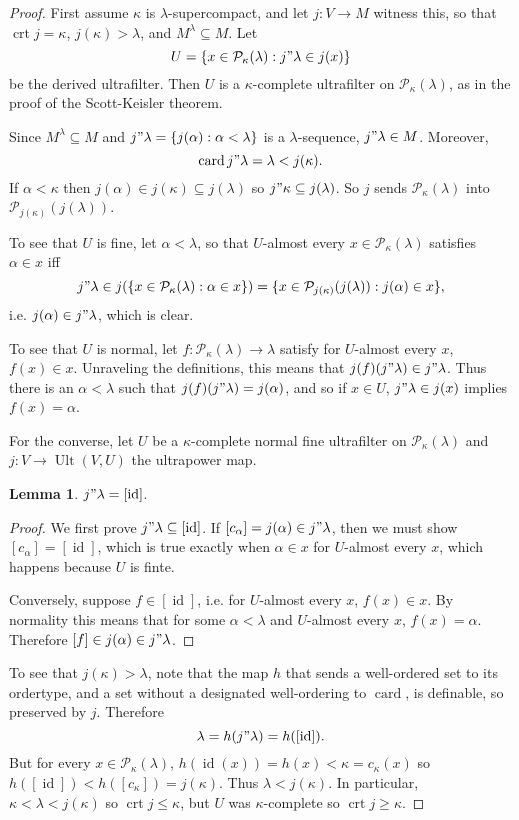 \documentclass[12pt]{report}
\newcommand{\card}{\operatorname{card}}
\newcommand{\id}{\operatorname{id}}
\newcommand{\pset}{\mathcal{P}}
\DeclareMathOperator{\crt}{crt}
\DeclareMathOperator{\Ult}{Ult}
\theoremstyle{definition}
\newtheorem{lemma}[theorem]{Lemma}
\begin{document}
\begin{proof}
First assume $\kappa$ is $\lambda$-supercompact, and let $j: V \to M$ witness this, so that $\crt j = \kappa$, $j(\kappa) > \lambda$, and $M^\lambda \subseteq M$. Let
$$U = \{x \in \pset_\kappa(\lambda): j"\lambda \in j(x)\}$$
be the derived ultrafilter. Then $U$ is a $\kappa$-complete ultrafilter on $\pset_\kappa(\lambda)$, as in the proof of the Scott-Keisler theorem.

Since $M^\lambda \subseteq M$ and $j"\lambda = \{j(\alpha): \alpha < \lambda\}$ is a $\lambda$-sequence, $j"\lambda \in M$. Moreover,
$$\card j"\lambda = \lambda < j(\kappa).$$
If $\alpha < \kappa$ then $j(\alpha) \in j(\kappa) \subseteq j(\lambda)$ so $j"\kappa \subseteq j(\lambda)$.
So $j$ sends $\pset_\kappa(\lambda)$ into $\pset_{j(\kappa)}(j(\lambda))$.

To see that $U$ is fine, let $\alpha < \lambda$, so that $U$-almost every $x \in \pset_\kappa(\lambda)$ satisfies $\alpha \in x$ iff
$$j"\lambda \in j(\{x \in \pset_\kappa(\lambda): \alpha \in x\}) = \{x \in \pset_{j(\kappa)}(j(\lambda)): j(\alpha) \in x\},$$
i.e. $j(\alpha) \in j"\lambda$, which is clear.

To see that $U$ is normal, let $f: \pset_\kappa(\lambda) \to \lambda$ satisfy for $U$-almost every $x$, $f(x) \in x$.
Unraveling the definitions, this means that $j(f)(j"\lambda) \in j"\lambda$.
Thus there is an $\alpha < \lambda$ such that $j(f)(j"\lambda) = j(\alpha)$, and so if $x \in U$, $j"\lambda \in j(x)$ implies $f(x) = \alpha$.

For the converse, let $U$ be a $\kappa$-complete normal fine ultrafilter on $\pset_\kappa(\lambda)$ and $j: V \to \Ult(V, U)$ the ultrapower map.
\begin{lemma}
$j"\lambda = [\id]$.
\end{lemma}
\begin{proof}
We first prove $j"\lambda \subseteq [\id]$. If $[c_\alpha] = j(\alpha) \in j"\lambda$, then we must show $[c_\alpha] = [\id]$, which is true exactly when $\alpha \in x$ for $U$-almost every $x$, which happens because $U$ is finte.

Conversely, suppose $f \in [\id]$, i.e. for $U$-almost every $x$, $f(x) \in x$. By normality this means that for some $\alpha < \lambda$ and $U$-almost every $x$, $f(x) = \alpha$. Therefore $[f] \in j(\alpha) \in j"\lambda$.
\end{proof}

To see that $j(\kappa) > \lambda$, note that the map $h$ that sends a well-ordered set to its ordertype, and a set without a designated well-ordering to $\card$, is definable, so preserved by $j$.
Therefore
$$\lambda = h(j"\lambda) = h([\id]).$$
But for every $x \in \pset_\kappa(\lambda)$, $h(\id(x)) = h(x) < \kappa = c_\kappa(x)$
so $h([\id]) < h([c_\kappa]) = j(\kappa)$. Thus $\lambda < j(\kappa)$.
In particular, $\kappa < \lambda < j(\kappa)$ so $\crt j \leq \kappa$, but $U$ was $\kappa$-complete so $\crt j \geq \kappa$.


\end{proof}
\end{document}
